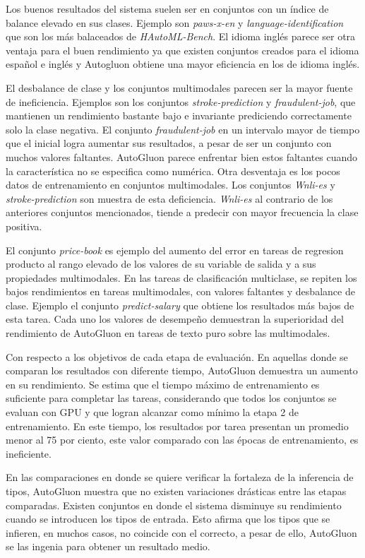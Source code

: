 Los buenos resultados del sistema suelen ser en conjuntos con un índice de balance elevado en sus clases. Ejemplo son \textit{paws-x-en} y 
\textit{language-identification} que son los más balaceados de \textit{HAutoML-Bench}. El idioma inglés parece ser otra ventaja para el buen rendimiento ya que
existen conjuntos creados para el idioma español e inglés y Autogluon obtiene una mayor eficiencia en los de idioma inglés.

El desbalance de clase y los conjuntos multimodales parecen ser la mayor fuente de ineficiencia. Ejemplos son los conjuntos \textit{stroke-prediction} y 
\textit{fraudulent-job}, que mantienen un rendimiento bastante bajo e invariante prediciendo correctamente solo la clase negativa. El conjunto \textit{fraudulent-job} 
en un intervalo mayor de tiempo que el inicial logra aumentar sus resultados, a pesar de ser un conjunto con muchos valores faltantes. AutoGluon parece 
enfrentar bien estos faltantes cuando la característica no se especifica como numérica. Otra desventaja es los 
pocos datos de entrenamiento en conjuntos multimodales. Los conjuntos \textit{Wnli-es} y \textit{stroke-prediction} son muestra de esta deficiencia. \textit{Wnli-es} al 
contrario de los anteriores conjuntos mencionados, tiende a predecir con mayor frecuencia la clase positiva.

El conjunto \textit{price-book} es ejemplo del aumento del error en tareas de regresion producto al rango elevado de los valores de su variable de salida y a sus 
propiedades multimodales.  En las tareas de clasificación multiclase, se repiten los bajos rendimientos
en tareas multimodales, con valores faltantes y desbalance de clase. Ejemplo el conjunto \textit{predict-salary} que obtiene los resultados más bajos de esta tarea. 
Cada uno los valores de desempeño demuestran la superioridad del rendimiento de AutoGluon en tareas de texto puro sobre las multimodales. 

Con respecto a los objetivos de cada etapa de evaluación. En aquellas donde se comparan los resultados con diferente tiempo, AutoGluon demuestra un aumento en 
su rendimiento. Se estima que el tiempo máximo de entrenamiento es suficiente para completar las tareas, considerando que todos los conjuntos se evaluan con GPU y que 
logran alcanzar como mínimo la etapa 2 de entrenamiento. En este tiempo, los resultados por tarea presentan un promedio menor al 75 por ciento, este valor comparado 
con las épocas de entrenamiento, es ineficiente. 

En las comparaciones en donde se quiere verificar la fortaleza de la inferencia de tipos, AutoGluon muestra que no existen variaciones drásticas entre las etapas 
comparadas. Existen conjuntos en donde el sistema disminuye su rendimiento cuando se introducen los tipos de entrada. Esto afirma que los tipos que se infieren, 
en muchos casos, no coincide con el correcto, a pesar de ello, AutoGluon se las ingenia para obtener un resultado medio.


